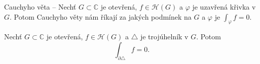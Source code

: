 \begin{note}
Cauchyho věta -- Nechť $G \subset \mathbb{C}$ je otevřená, $f \in \mathcal{H}(G)$ a $\varphi$ je uzavřená křivka v $G$. Potom Cauchyho věty nám říkají za jakých podmínek na $G$ a $\varphi$ je $\int_\varphi f=0$.
\end{note}%

\begin{theorem} %
Nechť $G \subset \mathbb{C}$ je otevřená, $f \in \mathcal{H}(G)$ a $\triangle$ je trojúhelník v $G$. Potom
\begin{equation}
    \int_{\partial\triangle}f=0\text{.}
\end{equation} 
\end{theorem}

